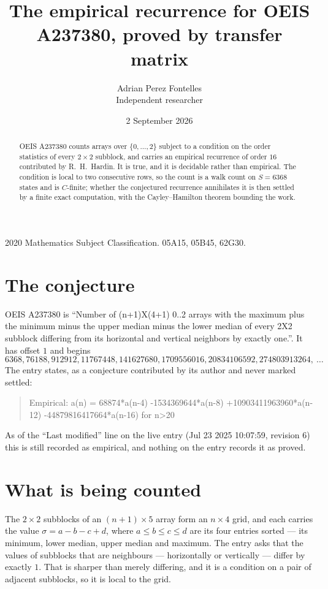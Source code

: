 \documentclass[11pt,a4paper]{article}
\title{The empirical recurrence for OEIS A237380, proved by transfer matrix}
\author{Adrian Perez Fontelles\\ \small Independent researcher}
\date{2 September 2026}
\theoremstyle{plain}
\theoremstyle{definition}
\begin{document}
\maketitle

\begin{abstract}
OEIS A237380 counts arrays over $\{0,\dots,2\}$ subject to a condition on the order
statistics of every $2\times2$ subblock, and carries an empirical recurrence of order
$16$ contributed by R.~H.~Hardin. It is true, and it is decidable rather than empirical.
The condition is local to two consecutive rows, so the count is a walk count on $S=6368$
states and is $C$-finite; whether the conjectured recurrence annihilates it is then settled by
a finite exact computation, with the Cayley--Hamilton theorem bounding the work.
\end{abstract}

\noindent\small 2020 Mathematics Subject Classification. 05A15, 05B45, 62G30.\normalsize

\section{The conjecture}

OEIS A237380 is ``Number of (n+1)X(4+1) 0..2 arrays with the maximum plus the minimum minus the upper median minus the lower median of every 2X2 subblock differing from its horizontal and vertical neighbors by exactly one.''. It has offset $1$ and begins
\[
6368, 76188, 912912, 11767448, 141627680, 1709556016, 20834106592, 274803913264,\ \dots
\]
The entry states, as a conjecture contributed by its author and never marked settled:
\begin{quote}
Empirical: a(n) = 68874*a(n-4) -1534369644*a(n-8) +10903411963960*a(n-12) -44879816417664*a(n-16) for n>20
\end{quote}
As of the ``Last modified'' line on the live entry (Jul 23 2025 10:07:59, revision 6) this is still
recorded as empirical, and nothing on the entry records it as proved.

\section{What is being counted}

The $2\times2$ subblocks of an $(n+1)\times5$ array form an
$n\times4$ grid, and each carries the value $\sigma=a-b-c+d$, where $a\le b\le c\le d$ are its four entries sorted --- its minimum, lower median, upper median and maximum. The entry asks that the values of
subblocks that are neighbours --- horizontally or vertically --- differ by exactly $1$.
That is sharper than merely differing, and it is a condition on a pair of adjacent subblocks,
so it is local to the grid.
\end{document}
